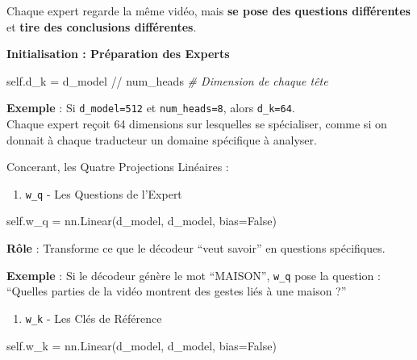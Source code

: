 \documentclass[12pt]{article}
\providecommand{\tightlist}{%
      \setlength{\itemsep}{0pt}\setlength{\parskip}{0pt}}
\newenvironment{Shaded}{}{}
\newcommand{\CommentTok}[1]{\textcolor[rgb]{0.38,0.63,0.69}{\textit{{#1}}}}
\newcommand{\NormalTok}[1]{{#1}}
\newcommand{\VariableTok}[1]{\textcolor[rgb]{0.10,0.09,0.49}{{#1}}}
\newcommand{\OperatorTok}[1]{\textcolor[rgb]{0.40,0.40,0.40}{{#1}}}
\begin{document}
Chaque expert regarde la même vidéo, mais \textbf{se pose des questions
différentes} et \textbf{tire des conclusions différentes}.

\textbf{Initialisation : Préparation des Experts}

\begin{Shaded}
\begin{Highlighting}[]
\VariableTok{self}\NormalTok{.d\_k }\OperatorTok{=}\NormalTok{ d\_model }\OperatorTok{//}\NormalTok{ num\_heads  }\CommentTok{\# Dimension de chaque tête}
\end{Highlighting}
\end{Shaded}

\textbf{Exemple} : Si \texttt{d\_model=512} et \texttt{num\_heads=8},
alors \texttt{d\_k=64}.\\
Chaque expert reçoit 64 dimensions sur lesquelles se spécialiser, comme
si on donnait à chaque traducteur un domaine spécifique à analyser.

Concerant, les Quatre Projections Linéaires :

\begin{enumerate}
\def\labelenumi{\arabic{enumi}.}
\tightlist
\item
  \texttt{w\_q} - Les Questions de l'Expert
\end{enumerate}

\begin{Shaded}
\begin{Highlighting}[]
\VariableTok{self}\NormalTok{.w\_q }\OperatorTok{=}\NormalTok{ nn.Linear(d\_model, d\_model, bias}\OperatorTok{=}\VariableTok{False}\NormalTok{)}
\end{Highlighting}
\end{Shaded}

\textbf{Rôle} : Transforme ce que le décodeur ``veut savoir'' en
questions spécifiques.

\textbf{Exemple} : Si le décodeur génère le mot ``MAISON'',
\texttt{w\_q} pose la question : ``Quelles parties de la vidéo montrent
des gestes liés à une maison ?''

\begin{enumerate}
\def\labelenumi{\arabic{enumi}.}
\setcounter{enumi}{1}
\tightlist
\item
  \texttt{w\_k} - Les Clés de Référence
\end{enumerate}

\begin{Shaded}
\begin{Highlighting}[]
\VariableTok{self}\NormalTok{.w\_k }\OperatorTok{=}\NormalTok{ nn.Linear(d\_model, d\_model, bias}\OperatorTok{=}\VariableTok{False}\NormalTok{)  }
\end{Highlighting}
\end{Shaded}
\end{document}
